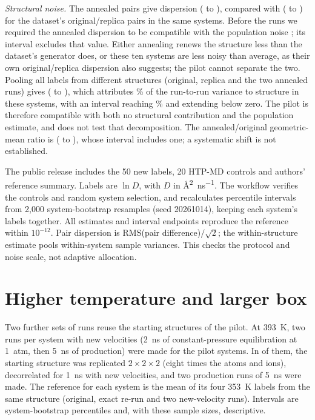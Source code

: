 \documentclass[11pt]{article}
\begin{document}
\emph{Structural noise.} The annealed pairs give dispersion \pilSdRec{} (\pilSdRecLo{} to
\pilSdRecHi), compared with \pilSdHtp{} (\pilSdHtpLo{} to \pilSdHtpHi) for the dataset's
original/replica pairs in the same systems. Before the runs we required the annealed dispersion
to be compatible with the population noise \RepEndSd{}; its interval excludes that value. Either
annealing renews the structure less than the dataset's generator does, or these ten systems are
less noisy than average, as their own original/replica dispersion also suggests; the pilot cannot
separate the two. Pooling all labels from different structures (original, replica and the two
annealed runs) gives \pilSdDistinct{} (\pilSdDistinctLo{} to \pilSdDistinctHi), which attributes
\pilStrPct\% of the run-to-run variance to structure in these systems, with an interval reaching
\pilStrPctHi\% and extending below zero. The pilot is therefore compatible with both no structural
contribution and the population estimate, and does not test that decomposition. The
annealed/original geometric-mean ratio is \pilRecShift{} (\pilRecShiftLo{} to \pilRecShiftHi),
whose interval includes one; a systematic shift is not established.

The public release includes the 50 new labels, 20 HTP-MD controls and authors' reference
summary. Labels are $\ln D$, with $D$ in \si{\angstrom\squared\per\nano\second}.
The workflow verifies the controls and random system selection, and recalculates percentile
intervals from 2,000 system-bootstrap resamples (seed 20261014), keeping each system's labels
together. All estimates and interval endpoints reproduce the reference within $10^{-12}$.
Pair dispersion is RMS(pair difference)$/\sqrt{2}$; the within-structure estimate pools
within-system sample variances. This checks the protocol and noise scale, not adaptive allocation.

\section{Higher temperature and larger box}\label{si:sec:extension}
Two further sets of runs reuse the starting structures of the pilot. At \SI{393}{\kelvin}, two runs
per system with new velocities (\SI{2}{\nano\second} of constant-pressure equilibration at
\SI{1}{atm}, then \SI{5}{\nano\second} of production) were made for the \ampTN{} pilot systems. In
\ampBoxN{} of them, the starting structure was replicated $2\times2\times2$ (eight times the atoms
and ions), decorrelated for \SI{1}{\nano\second} with new velocities, and two production runs of
\SI{5}{\nano\second} were made. The reference for each system is the mean of its four
\SI{353}{\kelvin} labels from the same structure (original, exact re-run and two new-velocity
runs). Intervals are system-bootstrap percentiles and, with these sample sizes, descriptive.
\end{document}
